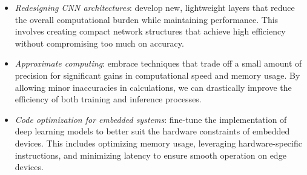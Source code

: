 \begin{itemize} 
    \item \textit{Redesigning CNN architectures}: develop new, lightweight layers that reduce the overall computational burden while maintaining performance. 
        This involves creating compact network structures that achieve high efficiency without compromising too much on accuracy.
    \item \textit{Approximate computing}: embrace techniques that trade off a small amount of precision for significant gains in computational speed and memory usage. 
        By allowing minor inaccuracies in calculations, we can drastically improve the efficiency of both training and inference processes.  
    \item \textit{Code optimization for embedded systems}: fine-tune the implementation of deep learning models to better suit the hardware constraints of embedded devices. 
        This includes optimizing memory usage, leveraging hardware-specific instructions, and minimizing latency to ensure smooth operation on edge devices.
\end{itemize}